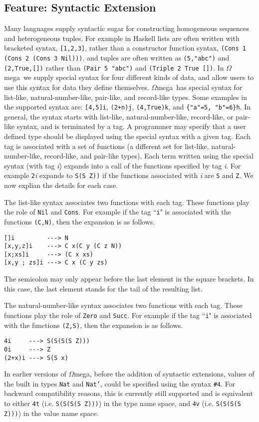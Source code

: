 \documentclass[11pt,twoside,A4]{llncs}
\newcommand{\om}{\emph{$\Omega$}mega}
\begin{document}
\subsection{Feature: Syntactic Extension} \label{synext}
Many languages supply syntactic sugar for constructing homogeneous sequences and
heterogeneous tuples. For example in Haskell lists are often
written with bracketed syntax, \verb+[1,2,3]+, rather than a constructor function syntax, \verb+(Cons 1 (Cons 2 (Cons 3 Nil)))+, and
tuples are often written as \verb+(5,"abc")+ and \verb+(2,True,[])+
rather than \verb+(Pair 5 "abc")+ and \verb+(Triple 2 True [])+. In \om\
we supply special syntax for four different kinds of data, and allow users to
use this syntax for data they define themselves. \om\ has
special syntax for list-like, natural-number-like, pair-like, and record-like types.
Some examples in the supported syntax are: \verb+[4,5]i+, \verb|(2+n)j|,
\verb+(4,True)k+, and \verb+{"a"=5, "b"=6}h+. In general, the syntax starts 
with list-like, natural-number-like, record-like, or pair-like syntax,
and is terminated by a tag. A programmer may specify that 
a user defined type should be displayed using the special syntax with a given tag. Each
tag is associated with a set of functions (a different set for
list-like, natural-number-like, record-like, and pair-like types). Each
term written using the special syntax (with tag {\it i}) expands into a call of the
functions specified by tag {\it i}. For example {\tt 2}{\it i} expands to {\tt S(S Z))}
if the functions associated with {\it i} are {\tt S} and {\tt Z}. We now
explian the details for each case.


The list-like syntax associates two functions with each
tag. These functions play the role of {\tt Nil} and {\tt Cons}.
For example if the tag ``{\tt i}" is associated with
the functions {\tt (C,N)}, then the expansion is as follows.
{\small
\begin{verbatim}
[]i         ---> N
[x,y,z]i    ---> C x(C y (C z N))
[x;xs]i     ---> (C x xs)
[x,y ; zs]i ---> C x (C y zs)
\end{verbatim}}
\noindent
The semicolon may only appear before the last element in the square brackets.
In this case, the last element stands for the tail of the resulting list.

The natural-number-like syntax associates two functions with each
tag. These functions play the role of {\tt Zero} and {\tt Succ}.
For example if the tag ``{\tt i}" is associated with
the functions {\tt (Z,S)}, then the expansion is as follows.
{\small
\begin{verbatim}
4i     ---> S(S(S(S Z)))
0i     ---> Z
(2+x)i ---> S(S x)
\end{verbatim}}
In earlier versions of \om, before the addition of syntactic
extensions, values of the
built in types {\tt Nat} and {\tt Nat'}, could 
be specified using the syntax \verb+#4+. 
For backward compatibility reasons, this is currently still
supported and is equivalent 
to either \verb+4t+ (i.e. {\tt  S(S(S(S Z)))}) in the type name space, and \verb+4v+ 
(i.e. {\tt  S(S(S(S Z)))}) in the value name space.
\end{document}
